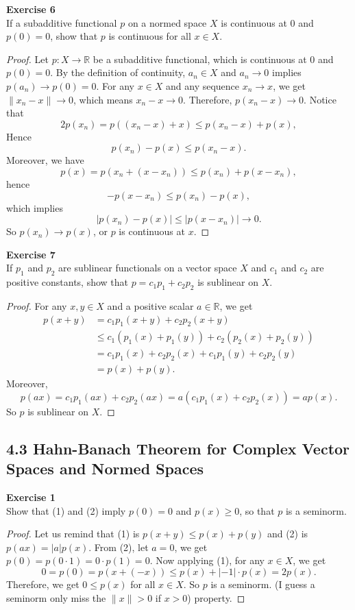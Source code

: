 \documentclass[12pt, a4paper]{article}
\theoremstyle{plain}
\newcommand{\R}{\mathbb{R}}
\newenvironment{exercise}[2][Exercise]
    { \begin{mdframed}[backgroundcolor=gray!20] \textbf{#1 #2} \\}
    {  \end{mdframed}}
\begin{document}
\begin{exercise}{6}
If a subadditive functional $p$ on a normed space $X$ is continuous at $0$ and $p(0)=0$, show that $p$ is continuous for all $x\in X$.
\end{exercise}
	\begin{proof}
	Let $p:X\rightarrow \R$ be a subadditive functional, which is continuous at $0$ and $p(0)=0$. By the definition of continuity, $a_n\in X$ and $a_n\rightarrow 0$ implies $p(a_n)\rightarrow p(0)=0$. For any $x\in X$ and any sequence $x_n\rightarrow x$, we get $\|x_n-x\|\rightarrow 0$, which means $x_n-x\rightarrow 0$. Therefore, $p(x_n-x)\rightarrow 0$. Notice that
	\[2
	p(x_n) = p((x_n-x) +x)\leq p(x_n-x) + p(x),
	\]
	Hence 
	\[
	p(x_n)-p(x)\leq p(x_n-x).
	\]
	Moreover, we have
	\[
	p(x) = p(x_n + (x-x_n))\leq p(x_n) + p(x-x_n),
	\]
	hence
	\[
	-p(x-x_n)\leq p(x_n)-p(x),
	\]
	which implies
	\[
	|p(x_n)-p(x)|\leq |p(x-x_n)|\rightarrow 0.
	\]
	So $p(x_n)\rightarrow p(x)$, or $p$ is continuous at $x$.
	\end{proof}
	
\begin{exercise}{7}
If $p_1$ and $p_2$ are sublinear functionals on a vector space $X$ and $c_1$ and $c_2$ are positive constants, show that $p=c_1p_1+c_2p_2$ is sublinear on $X$.
\end{exercise}
	\begin{proof}
	For any $x,y\in X$ and a positive scalar $a\in \R$, we get
	\begin{align*}
	p(x+y) &= c_1p_1(x+y)+c_2p_2(x+y)\\
	&\leq c_1(p_1(x)+p_1(y))+c_2(p_2(x)+p_2(y))\\
	&=c_1p_1(x) + c_2p_2(x) + c_1p_1(y)+c_2p_2(y)\\
	&=p(x)+p(y).
	\end{align*}
	Moreover, 
	\[
	p(ax) = c_1p_1(ax)+c_2p_2(ax)  =a(c_1p_1(x)+c_2p_2(x))=ap(x).
	\]
	So $p$ is sublinear on $X$.
	\end{proof}
	
	
\subsection*{4.3 Hahn-Banach Theorem for Complex Vector Spaces and Normed Spaces}

\begin{exercise}{1}
Show that (1) and (2) imply $p(0)=0$ and $p(x)\geq 0$, so that $p$ is a seminorm.
\end{exercise}
	\begin{proof}
	Let us remind that (1) is $p(x+y)\leq p(x)+p(y)$ and (2) is $p(ax)=|a|p(x)$. From (2), let $a=0$, we get $p(0)=p(0\cdot 1)=0\cdot p(1)=0$. Now applying (1), for any $x\in X$, we get
	\[
	0=p(0)=p(x+(-x))\leq p(x)+|-1|\cdot p(x)=2p(x).
	\]
	Therefore, we get $0\leq p(x)$ for all $x\in X$. So $p$ is a seminorm. (I guess a seminorm only miss the $\|x\|>0$ if $x>0$) property.
	\end{proof}
\end{document}
